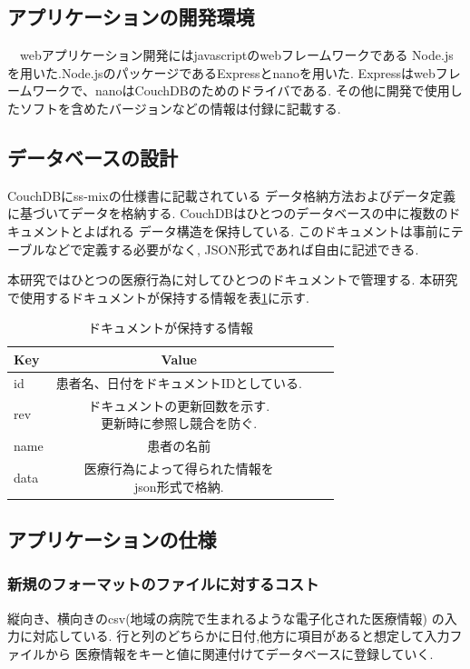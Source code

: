 \subsection{アプリケーションの開発環境}
　webアプリケーション開発にはjavascriptのwebフレームワークである
Node.jsを用いた.Node.jsのパッケージであるExpressとnanoを用いた.
Expressはwebフレームワークで、nanoはCouchDBのためのドライバである.
その他に開発で使用したソフトを含めたバージョンなどの情報は付録に記載する.




\subsection{データベースの設計}
	CouchDBにss-mixの仕様書に記載されている
	データ格納方法およびデータ定義\cite{bibi1}に基づいてデータを格納する.
	CouchDBはひとつのデータベースの中に複数のドキュメントとよばれる
	データ構造を保持している.
	このドキュメントは事前にテーブルなどで定義する必要がなく,
	JSON形式であれば自由に記述できる.

	本研究ではひとつの医療行為に対してひとつのドキュメントで管理する.
	本研究で使用するドキュメントが保持する情報を表\ref{tab:doc}に示す.


	\begin{table}[htb]
		\begin{center}
			\caption{ドキュメントが保持する情報}
			\begin{tabular}{|l|c|r|r|}\hline
			Key & Value \\ \hline \hline
			id &  患者名、日付をドキュメントIDとしている. \\ \hline
			rev & \shortstack{ドキュメントの更新回数を示す. \\ 更新時に参照し競合を防ぐ.} \\ \hline
			name & 患者の名前 \\ \hline
			data & \shortstack{医療行為によって得られた情報を \\ json形式で格納.} \\ \hline
			\end{tabular}
			\label{tab:doc}
		\end{center}
	\end{table}


\subsection{アプリケーションの仕様}

	\subsubsection{新規のフォーマットのファイルに対するコスト}
	縦向き、横向きのcsv(地域の病院で生まれるような電子化された医療情報)
	の入力に対応している.
	行と列のどちらかに日付,他方に項目があると想定して入力ファイルから
	医療情報をキーと値に関連付けてデータベースに登録していく.

